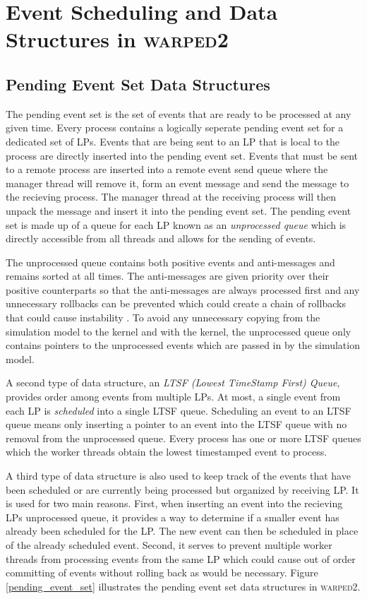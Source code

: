 \documentclass[11pt]{book}
\begin{document}
\chapter[Event Scheduling]{Event Scheduling and Data Structures in \textsc{warped2}}\label{warped2_ds}

\section{Pending Event Set Data Structures}

The pending event set is the set of events that are ready to be processed at any given time.
Every process contains a logically seperate pending event set for a dedicated set of LPs.  Events
that are being sent to an LP that is local to the process are directly inserted into the pending
event set.  Events that must be sent to a remote process are inserted into a remote event send
queue where the manager thread will remove it, form an event message and send the message to
the recieving process.  The manager thread at the receiving process will then unpack the message
and insert it into the pending event set.  The pending event set is made up of a queue for each
LP known as an \emph{unprocessed queue} which is directly accessible from all threads and allows
for the sending of events.

The unprocessed queue contains both positive events and anti-messages and remains sorted at all
times.  The anti-messages are given priority over their positive counterparts so that the
anti-messages are always processed first and any unnecessary rollbacks can be prevented which
could create a chain of rollbacks that could cause instability \cite{lubachevsky-89}.  To avoid
any unnecessary copying from the simulation model to the kernel and with the kernel, the
unprocessed queue only contains pointers to the unprocessed events which are passed in by the
simulation model.

A second type of data structure, an \emph{LTSF (Lowest TimeStamp First) Queue}, provides
order among events from multiple LPs.  At most, a single event from each LP is \emph{scheduled}
into a single LTSF queue.  Scheduling an event to an LTSF queue means only inserting a pointer
to an event into the LTSF queue with no removal from the unprocessed queue.  Every process has
one or more LTSF queues which the worker threads obtain the lowest timestamped event to process.

A third type of data structure is also used to keep track of the events that have been
scheduled or are currently being processed but organized by receiving LP.  It is used for
two main reasons.  First, when inserting an event into the recieving LPs unprocessed queue, it
provides a way to determine if a smaller event has already been scheduled for the LP.  The new
event can then be scheduled in place of the already scheduled event.  Second, it serves to
prevent multiple worker threads from processing events from the same LP which could cause
out of order committing of events without rolling back as would be necessary.
Figure \ref{pending_event_set} illustrates the pending event set data structures in
\textsc{warped2}.
\end{document}
